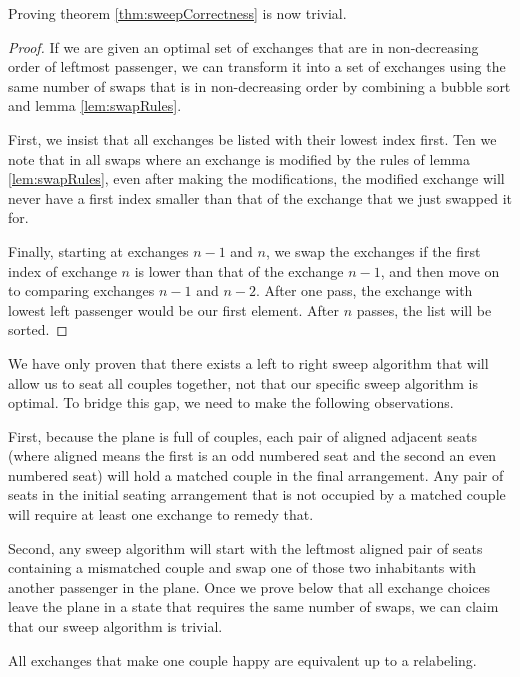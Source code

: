 \documentclass[11pt,twocolumn]{article}
\begin{document}
Proving theorem \ref{thm:sweepCorrectness} is now trivial.

\begin{proof}
If we are given an optimal set of exchanges that are in non-decreasing order of leftmost passenger, we can transform it into a set of exchanges using the same number of swaps that is in non-decreasing order by combining a bubble sort and lemma \ref{lem:swapRules}.

First, we insist that all exchanges be listed with their lowest index first.  Ten we note that in all swaps where an exchange is modified by the rules of lemma \ref{lem:swapRules}, even after making the modifications, the modified exchange will never have a first index smaller than that of the exchange that we just swapped it for.

Finally, starting at exchanges $n-1$ and $n$, we swap the exchanges if the first index of exchange $n$ is lower than that of the exchange $n-1$, and then move on to comparing exchanges $n-1$ and $n-2$.  After one pass, the exchange with lowest left passenger would be our first element. After $n$ passes, the list will be sorted.
\end{proof}

We have only proven that there exists a left to right sweep algorithm that will allow us to seat all couples together, not that our specific sweep algorithm is optimal.  To bridge this gap, we need to make the following observations.

First, because the plane is full of couples, each pair of aligned adjacent seats (where aligned means the first is an odd numbered seat and the second an even numbered seat) will hold a matched couple in the final arrangement.  Any pair of seats in the initial seating arrangement that is not occupied by a matched couple will require at least one exchange to remedy that.

Second, any sweep algorithm will start with the leftmost aligned pair of seats containing a mismatched couple and swap one of those two inhabitants with another passenger in the plane.  Once we prove below that all exchange choices leave the plane in a state that requires the same number of swaps, we can claim that our sweep algorithm is trivial.

\begin{lem} \label{lem:identicalToRelabel}
All exchanges that make one couple happy are equivalent up to a relabeling.
\end{lem}
\end{document}
